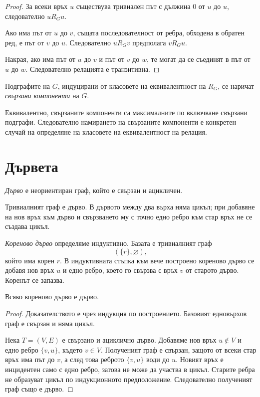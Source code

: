 \begin{proof}
За всеки връх $u$ съществува тривиален път с дължина $0$ от $u$ до $u$, следователно $uR_Gu$.

Ако има път от $u$ до $v$, същата последователност от ребра, обходена в обратен ред, е път от $v$ до $u$. Следователно $uR_Gv$ предполага $vR_Gu$.

Накрая, ако има път от $u$ до $v$ и път от $v$ до $w$, те могат да се съединят в път от $u$ до $w$. Следователно релацията е транзитивна.
\end{proof}

\begin{defn}
Подграфите на $G$, индуцирани от класовете на еквивалентност на $R_G$, се наричат \emph{свързани компоненти} на $G$.
\end{defn}

Еквивалентно, свързаните компоненти са максималните по включване свързани подграфи. Следователно намирането на свързаните компоненти е конкретен случай на определяне на класовете на еквивалентност на релация.

\section{Дървета}\label{s:3.4}

\begin{defn}
\emph{Дърво} е неориентиран граф, който е свързан и ацикличен.
\end{defn}

Тривиалният граф е дърво. В дървото между два върха няма цикъл; при добавяне на нов връх към дърво и свързването му с точно едно ребро към стар връх не се създава цикъл.

\begin{defn}
\emph{Кореново дърво} определяме индуктивно. Базата е тривиалният граф
\[
(\{r\},\varnothing),
\]
който има корен $r$. В индуктивната стъпка към вече построено кореново дърво се добавя нов връх $u$ и едно ребро, което го свързва с връх $v$ от старото дърво. Коренът се запазва.
\end{defn}

\begin{thm}
Всяко кореново дърво е дърво.
\end{thm}

\begin{proof}
Доказателството е чрез индукция по построението. Базовият едновърхов граф е свързан и няма цикъл.

Нека $T=(V,E)$ е свързано и ациклично дърво. Добавяме нов връх $u\notin V$ и едно ребро $\{v,u\}$, където $v\in V$. Полученият граф е свързан, защото от всеки стар връх има път до $v$, а след това реброто $\{v,u\}$ води до $u$. Новият връх е инцидентен само с едно ребро, затова не може да участва в цикъл. Старите ребра не образуват цикъл по индукционното предположение. Следователно полученият граф също е дърво.
\end{proof}

